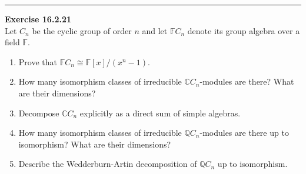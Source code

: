 \documentclass[a4paper, 12pt]{article}
\newenvironment{problem}[2][Exercise]
    { \begin{mdframed}[backgroundcolor=gray!20] \textbf{#1 #2} \\}
    {  \end{mdframed}}
\begin{document}
\noindent\rule{7in}{2.8pt}
\begin{problem}{16.2.21}
Let \(C_n\) be the cyclic group of order \(n\) and let \(\mathbb{F}C_n\) denote its group algebra over a field \(\mathbb{F}\).
\begin{enumerate}[(1)]
\item Prove that \(\mathbb{F}C_n\cong \mathbb{F}[x]/(x^n-1)\). 
\item How many isomorphism classes of irreducible \(\mathbb{C}C_n\)-modules are there? What are their dimensions? 
\item Decompose \(\mathbb{C}C_n\) explicitly as a direct sum of simple algebras. 
\item How many isomorphism classes of irreducible \(\mathbb{Q}C_n\)-modules are there up to isomorphism? What are their dimensions? 
\item Describe the Wedderburn-Artin decomposition of \(\mathbb{Q}C_n\) up to isomorphism.
\end{enumerate}
\end{problem}
\end{document}
